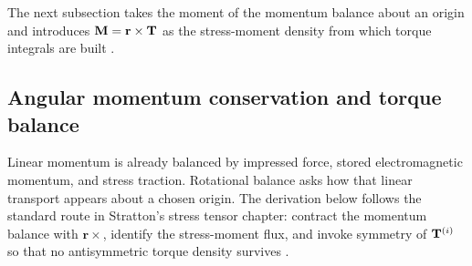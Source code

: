 The next subsection takes the moment of the momentum balance about an origin and introduces $\mathbf{M}=\mathbf{r}\times\mathbf{T}$ as the stress-moment density from which torque integrals are built \cite{stratton1941}.

\subsection{Angular momentum conservation and torque balance}
\label{sec:ch01.1.5}

Linear momentum is already balanced by impressed force, stored electromagnetic momentum, and stress traction. Rotational balance asks how that linear transport appears about a chosen origin. The derivation below follows the standard route in Stratton's stress tensor chapter: contract the momentum balance with $\mathbf{r}\times$, identify the stress-moment flux, and invoke symmetry of $\mathbf{T}^{(i)}$ so that no antisymmetric torque density survives \cite{stratton1941,harrington2001}.

